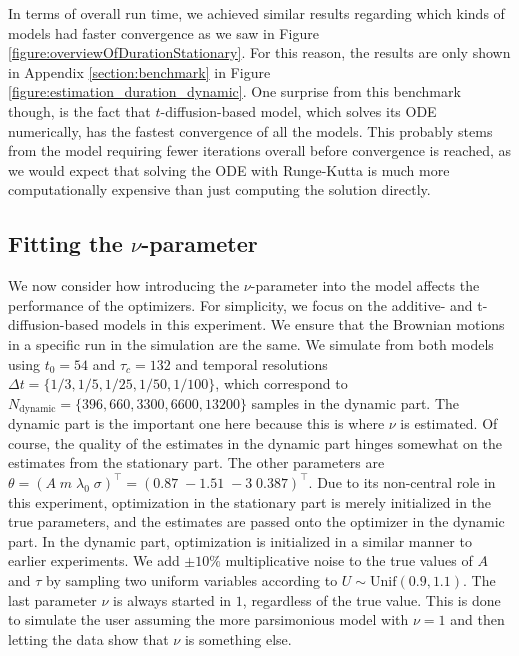 In terms of overall run time, we achieved similar results regarding which kinds of models had faster convergence as we saw in Figure \ref{figure:overviewOfDurationStationary}. For this reason, the results are only shown in Appendix \ref{section:benchmark} in Figure \ref{figure:estimation_duration_dynamic}. One surprise from this benchmark though, is the fact that $t$-diffusion-based model, which solves its ODE numerically, has the fastest convergence of all the models. This probably stems from the model requiring fewer iterations overall before convergence is reached, as we would expect that solving the ODE with Runge-Kutta is much more computationally expensive than just computing the solution directly.
\subsection{Fitting the \texorpdfstring{$\nu$}{nu}-parameter}
We now consider how introducing the $\nu$-parameter into the model affects the performance of the optimizers. For simplicity, we focus on the additive- and t-diffusion-based models in this experiment. We ensure that the Brownian motions in a specific run in the simulation are the same. We simulate from both models using $t_0 = 54$ and $\tau_c = 132$ and temporal resolutions $\Delta t = \{1/3, 1/5, 1/25, 1/50, 1/100\}$, which correspond to $N_\mathrm{dynamic} = \{396, 660, 3300, 6600, 13200\}$ samples in the dynamic part. The dynamic part is the important one here because this is where $\nu$ is estimated. Of course, the quality of the estimates in the dynamic part hinges somewhat on the estimates from the stationary part.
The other parameters are $\theta = (A\; m\; \lambda_0\; \sigma)^\top = (0.87\; -1.51\; -3\;  0.387)^\top$. Due to its non-central role in this experiment, optimization in the stationary part is merely initialized in the true parameters, and the estimates are passed onto the optimizer in the dynamic part. In the dynamic part, optimization is initialized in a similar manner to earlier experiments. We add $\pm 10\%$ multiplicative noise to the true values of $A$ and $\tau$ by sampling two uniform variables according to $U\sim \mathrm{Unif}(0.9,1.1)$. The last parameter $\nu$ is always started in $1$, regardless of the true value. This is done to simulate the user assuming the more parsimonious model with $\nu = 1$ and then letting the data show that $\nu$ is something else. 

